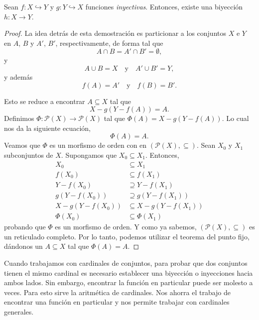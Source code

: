 \begin{theorem}
	Sean $f: X \hookrightarrow Y$ y $g: Y \hookrightarrow X$ funciones \textit{inyectivas}. Entonces, existe una biyección $h: X \to  Y$.
\end{theorem}

\begin{proof}
	La idea detrás de esta demostración es particionar a los conjuntos $X$ e $Y$ en $A$, $B$ y $A'$, $B'$, respectivamente, de forma tal que
	$$
		A \cap B = A' \cap B' = \emptyset,
	$$
	y
	$$
		A \cup B = X \quad \text{y} \quad A' \cup B' = Y,
	$$
	y además
	$$
		f(A) = A' \quad \text{y} \quad f(B) = B'.
	$$
	\begin{center}
		
	\end{center}

	Esto se reduce a encontrar $A \subseteq X$ tal que
	$$
		X - g(Y - f(A)) = A.
	$$
	Definimos $\Phi : \mathcal{P}(X) \to  \mathcal{P}(X)$ tal que $\Phi(A) = X - g(Y - f(A))$. Lo cual nos da la siguiente ecuación,
	$$
		\Phi (A) = A.
	$$
	Veamos que $\Phi$ es un morfismo de orden con en $(\mathcal{P}(X), \subseteq )$. Sean $X_{0}$ y $X_{1}$ subconjuntos de $X$. Supongamos que $X_{0} \subseteq X_{1}$. Entonces,
	\begin{align*}
		X_{0}               & \subseteq X_{1}               \\
		f(X_{0})            & \subseteq f(X_{1})            \\
		Y - f(X_{0})        & \supseteq Y - f(X_{1})        \\
		g(Y - f(X_{0}))     & \supseteq g(Y - f(X_{1}))     \\
		X - g(Y - f(X_{0})) & \subseteq X - g(Y - f(X_{1})) \\
		\Phi(X_{0})         & \subseteq \Phi(X_{1})
	\end{align*}
	probando que $\Phi$ es un morfismo de orden. Y como ya sabemos, $(\mathcal{P}(X), \subseteq)$ es un reticulado completo. Por lo tanto, podemos utilizar el teorema del punto fijo, dándonos un $A \subseteq X$ tal que $\Phi (A) = A$.
\end{proof}

Cuando trabajamos con cardinales de conjuntos, para probar que dos conjuntos tienen el mismo cardinal es necesario establecer una biyección o inyecciones hacia ambos lados. Sin embargo, encontrar la función en particular puede ser molesto a veces. Para esto sirve la aritmética de cardinales. Nos ahorra el trabajo de encontrar una función en particular y nos permite trabajar con cardinales generales.


